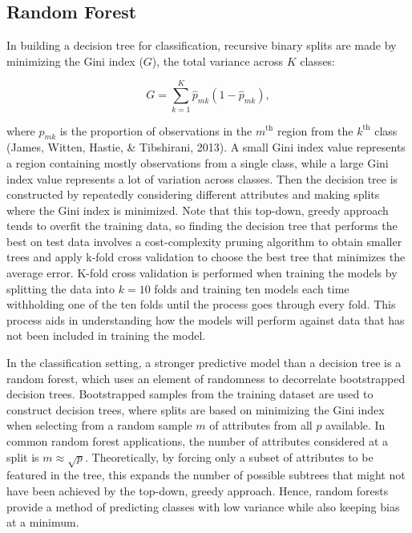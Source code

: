 \documentclass[12pt,twoside]{reedthesis}
\begin{document}
\hypertarget{random-forest}{%
\subsection{Random Forest}\label{random-forest}}

In building a decision tree for classification, recursive binary splits are made by minimizing the Gini index (\(G\)), the total variance across \(K\) classes:

\[G = \sum_{k = 1}^K\hat{p}_{mk}(1 - \hat{p}_{mk}),\]

where \(\hat{p}_{mk}\) is the proportion of observations in the \(m^{\text{th}}\) region from the \(k^{\text{th}}\) class (James, Witten, Hastie, \& Tibshirani, 2013). A small Gini index value represents a region containing mostly observations from a single class, while a large Gini index value represents a lot of variation across classes. Then the decision tree is constructed by repeatedly considering different attributes and making splits where the Gini index is minimized. Note that this top-down, greedy approach tends to overfit the training data, so finding the decision tree that performs the best on test data involves a cost-complexity pruning algorithm to obtain smaller trees and apply k-fold cross validation to choose the best tree that minimizes the average error. K-fold cross validation is performed when training the models by splitting the data into \(k = 10\) folds and training ten models each time withholding one of the ten folds until the process goes through every fold. This process aids in understanding how the models will perform against data that has not been included in training the model.

In the classification setting, a stronger predictive model than a decision tree is a random forest, which uses an element of randomness to decorrelate bootstrapped decision trees. Bootstrapped samples from the training dataset are used to construct decision trees, where splits are based on minimizing the Gini index when selecting from a random sample \(m\) of attributes from all \(p\) available. In common random forest applications, the number of attributes considered at a split is \(m \approx \sqrt{p}\). Theoretically, by forcing only a subset of attributes to be featured in the tree, this expands the number of possible subtrees that might not have been achieved by the top-down, greedy approach. Hence, random forests provide a method of predicting classes with low variance while also keeping bias at a minimum.
\end{document}
